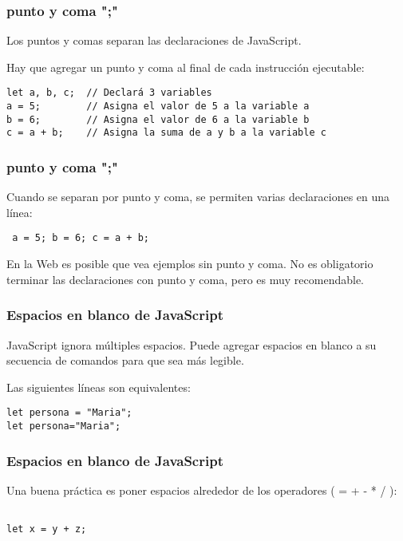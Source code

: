 \begin{frame}[fragile]
  \frametitle{punto y coma ";"}

  Los puntos y comas separan las declaraciones de JavaScript.

  \vspace{\baselineskip}
  Hay que agregar un punto y coma al final de cada instrucción ejecutable:

  \vspace{\baselineskip}
  \begin{lstlisting}
let a, b, c;  // Declará 3 variables
a = 5;        // Asigna el valor de 5 a la variable a
b = 6;        // Asigna el valor de 6 a la variable b
c = a + b;    // Asigna la suma de a y b a la variable c
  \end{lstlisting}
\end{frame}

\begin{frame}[fragile]
  \frametitle{punto y coma ";"}

  Cuando se separan por punto y coma,
  se permiten varias declaraciones en una línea:

  \vspace{\baselineskip}
  \begin{lstlisting}
 a = 5; b = 6; c = a + b;
  \end{lstlisting}

  \begin{block}{En la Web}
    es posible que vea ejemplos sin punto y coma.
    No es obligatorio terminar las declaraciones con punto y coma,
    pero es muy recomendable.
  \end{block}
\end{frame}

\begin{frame}[fragile]
  \frametitle{Espacios en blanco de JavaScript}

  JavaScript ignora múltiples espacios. Puede agregar espacios
  en blanco a su secuencia de comandos para que sea más legible.

  \vspace{\baselineskip}
  Las siguientes líneas son equivalentes:

  \vspace{\baselineskip}
  \begin{lstlisting}
let persona = "Maria";
let persona="Maria";
  \end{lstlisting}
\end{frame}

\begin{frame}[fragile]
  \frametitle{Espacios en blanco de JavaScript}

  Una buena práctica es poner espacios alrededor
  de los operadores ( = + - * / ):

  \vspace{\baselineskip}
  \begin{lstlisting}

let x = y + z;

  \end{lstlisting}
\end{frame}

